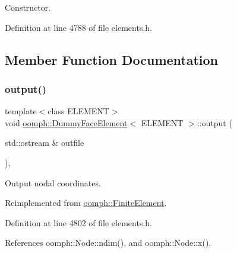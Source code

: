 Constructor. 



Definition at line 4788 of file elements.\+h.



\subsection{Member Function Documentation}
\mbox{\label{classoomph_1_1DummyFaceElement_a18c02152a69fd63b391a51aaae0279f2}} 
\subsubsection{\texorpdfstring{output()}{output()}\hspace{0.1cm}{\footnotesize\ttfamily [1/4]}}
{\footnotesize\ttfamily template$<$class E\+L\+E\+M\+E\+NT$>$ \\
void \hyperlink{classoomph_1_1DummyFaceElement}{oomph\+::\+Dummy\+Face\+Element}$<$ E\+L\+E\+M\+E\+NT $>$\+::output (\begin{DoxyParamCaption}\item[{std\+::ostream \&}]{outfile }\end{DoxyParamCaption})\hspace{0.3cm}{\ttfamily [inline]}, {\ttfamily [virtual]}}



Output nodal coordinates. 



Reimplemented from \hyperlink{classoomph_1_1FiniteElement_a2ad98a3d2ef4999f1bef62c0ff13f2a7}{oomph\+::\+Finite\+Element}.



Definition at line 4802 of file elements.\+h.



References oomph\+::\+Node\+::ndim(), and oomph\+::\+Node\+::x().

\mbox{\label{classoomph_1_1DummyFaceElement_a65af668caa98997d5ef1227e4f2bf733}} 
